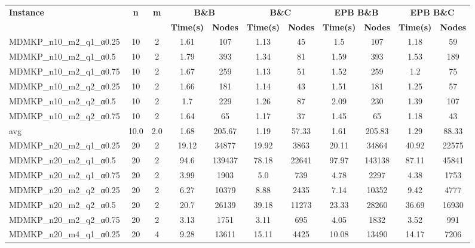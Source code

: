 \begin{table}[!ht]
\centering
\hspace*{-1cm}\begin{tabular}{lcccccccccc}
\toprule
\textbf{Instance} & \textbf{n} & \textbf{m} & \multicolumn{2}{c}{\textbf{B\&B}} & \multicolumn{2}{c}{\textbf{B\&C}}  & \multicolumn{2}{c}{\textbf{EPB B\&B}} & \multicolumn{2}{c}{\textbf{EPB B\&C}} \\

\cmidrule(r){4-5} \cmidrule(r){6-7} \cmidrule(r){8-9} \cmidrule(r){10-11} 
~ & ~ & ~ & \textbf{Time(s)} &\textbf{Nodes} & \textbf{Time(s)} &\textbf{Nodes} & \textbf{Time(s)} &\textbf{Nodes} & \textbf{Time(s)} &\textbf{Nodes}  \\
\midrule

MDMKP\_n10\_m2\_q1\_α0.25 & 10 & 2 & 1.61 & 107 & 1.13 & 45 & 1.5 & 107 & 1.18 & 59 \\
MDMKP\_n10\_m2\_q1\_α0.5 & 10 & 2 & 1.79 & 393 & 1.34 & 81 & 1.59 & 393 & 1.53 & 189 \\
MDMKP\_n10\_m2\_q1\_α0.75 & 10 & 2 & 1.67 & 259 & 1.13 & 51 & 1.52 & 259 & 1.2 & 75 \\
MDMKP\_n10\_m2\_q2\_α0.25 & 10 & 2 & 1.66 & 181 & 1.14 & 43 & 1.51 & 181 & 1.25 & 57 \\
MDMKP\_n10\_m2\_q2\_α0.5 & 10 & 2 & 1.7 & 229 & 1.26 & 87 & 2.09 & 230 & 1.39 & 107 \\
MDMKP\_n10\_m2\_q2\_α0.75 & 10 & 2 & 1.64 & 65 & 1.17 & 37 & 1.45 & 65 & 1.18 & 43 \\
\hline avg & 10.0 & 2.0 & 1.68& 205.67 & 1.19& 57.33 & 1.61& 205.83 & 1.29& 88.33\\ \hline
MDMKP\_n20\_m2\_q1\_α0.25 & 20 & 2 & 19.12 & 34877 & 19.92 & 3863 & 20.11 & 34864 & 40.92 & 22575 \\
MDMKP\_n20\_m2\_q1\_α0.5 & 20 & 2 & 94.6 & 139437 & 78.18 & 22641 & 97.97 & 143138 & 87.11 & 45841 \\
MDMKP\_n20\_m2\_q1\_α0.75 & 20 & 2 & 3.99 & 1903 & 5.0 & 739 & 4.78 & 2297 & 4.38 & 1753 \\
MDMKP\_n20\_m2\_q2\_α0.25 & 20 & 2 & 6.27 & 10379 & 8.88 & 2435 & 7.14 & 10352 & 9.42 & 4777 \\
MDMKP\_n20\_m2\_q2\_α0.5 & 20 & 2 & 20.7 & 26139 & 39.18 & 11273 & 23.33 & 28260 & 36.69 & 16930 \\
MDMKP\_n20\_m2\_q2\_α0.75 & 20 & 2 & 3.13 & 1751 & 3.11 & 695 & 4.05 & 1832 & 3.52 & 991 \\
MDMKP\_n20\_m4\_q1\_α0.25 & 20 & 4 & 9.28 & 13611 & 15.11 & 4425 & 10.08 & 13490 & 14.17 & 7206 \\

\end{tabular}
\end{table}
